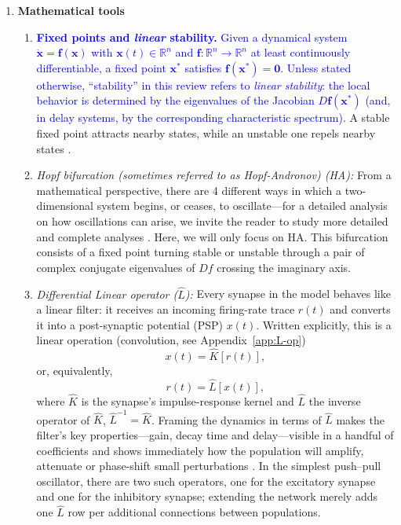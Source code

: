 \documentclass[12pt]{article}
\numberwithin{equation}{section}
\newcommand{\rev}[1]{\textcolor{blue}{#1}}
\begin{document}
\begin{enumerate}
\begin{enumerate}
 
\end{enumerate}


\item \textbf{Mathematical tools}
\begin{enumerate}
\item 
\rev{\textbf{Fixed points and \emph{linear} stability.}
Given a dynamical system $\dot{\mathbf{x}}=\mathbf{f}(\mathbf{x})$ with
$\mathbf{x}(t)\in\mathbb{R}^n$ and $\mathbf{f}:\mathbb{R}^n\to\mathbb{R}^n$ at least
continuously differentiable, a fixed point $\mathbf{x}^\ast$ satisfies
$\mathbf{f}(\mathbf{x}^\ast)=\mathbf{0}$.
Unless stated otherwise, ``stability'' in this review refers to \emph{linear stability}:
the local behavior is determined by the eigenvalues of the Jacobian
$D\mathbf{f}(\mathbf{x}^\ast)$ (and, in delay systems, by the corresponding characteristic
spectrum).}
A stable fixed point attracts nearby states, while an unstable one repels nearby states \cite{strogatz2018nonlinear}.
\item \textit{Hopf bifurcation (sometimes referred to as \textit{Hopf-Andronov}) (HA):} From a mathematical perspective, there are 4 different ways in which a two-dimensional system begins, or ceases, to oscillate—for a detailed analysis on how oscillations can arise, we invite the reader to study more detailed and complete analyses  \cite{strogatz2018nonlinear, hoppensteadt2012weakly,kuznetsov2023elements}. Here, we will only focus on HA.
This bifurcation consists of a fixed point turning stable or unstable through a pair of complex conjugate eigenvalues of $Df$ crossing the imaginary axis.

\item \emph{Differential Linear operator (\(\hat L\)):} Every synapse in the model behaves like a linear filter: it receives an incoming firing-rate trace \(r(t)\) and converts it into a post-synaptic potential (PSP) \(x(t)\).  Written explicitly, this is a linear operation (convolution, see Appendix~\ref{app:L-op})
\begin{equation}
x(t)=\hat K[r(t)] ,
\end{equation}
or, equivalently,
\begin{equation}
r(t)=\hat L[x(t)] ,
\end{equation}
where \(\hat K\) is the synapse’s impulse-response kernel and \(\hat L\) the inverse operator of \(\hat K\), $\hat L^{-1} = \hat K $.  Framing the dynamics in terms of \(\hat L\) makes the filter’s key properties—gain, decay time and delay—visible in a handful of coefficients and shows immediately how the population will amplify, attenuate or phase-shift small perturbations \cite{strogatz2018nonlinear}.  In the simplest push–pull oscillator, there are two such operators, one for the excitatory synapse and one for the inhibitory synapse; extending the network merely adds one \(\hat L\) row per additional connections between populations.


\end{enumerate}
\end{enumerate}
\end{document}
